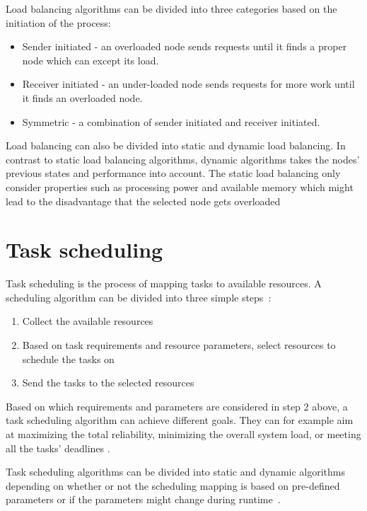 \documentclass{cslthse-msc}
\begin{document}
Load balancing algorithms can be divided into three categories based on the initiation of the process:
\begin{itemize}
\item Sender initiated - an overloaded node sends requests until it finds a proper node which can except its load.
\item Receiver initiated - an under-loaded node sends requests for more work until it finds an overloaded node. %
\item Symmetric - a combination of sender initiated and receiver initiated. 
\end{itemize}

Load balancing can also be divided into static and dynamic load balancing. In contrast to static load balancing algorithms, dynamic algorithms takes the nodes' previous states and performance into account. The static load balancing only consider properties such as processing power and available memory which might lead to the disadvantage that the selected node gets overloaded~\cite{perfAnalysisLoadCloud}

\section{Task scheduling} \label{sec:background_task_sched}
Task scheduling is the process of mapping tasks to available resources. A scheduling algorithm can be divided into three simple steps~\cite{optSchedCloud}:

\begin{enumerate}
	\item Collect the available resources
	\item Based on task requirements and resource parameters, select resources to schedule the tasks on
	\item Send the tasks to the selected resources
\end{enumerate}

Based on which requirements and parameters are considered in step 2 above, a task scheduling algorithm can achieve different goals. They can for example aim at maximizing the total reliability, minimizing the overall system load, or meeting all the tasks' deadlines \cite{schedulingSurvey}. 

Task scheduling algorithms can be divided into static and dynamic algorithms depending on whether or not the scheduling mapping is based on pre-defined parameters or if the parameters might change during runtime~\cite{schedReplicas}.
\end{document}
